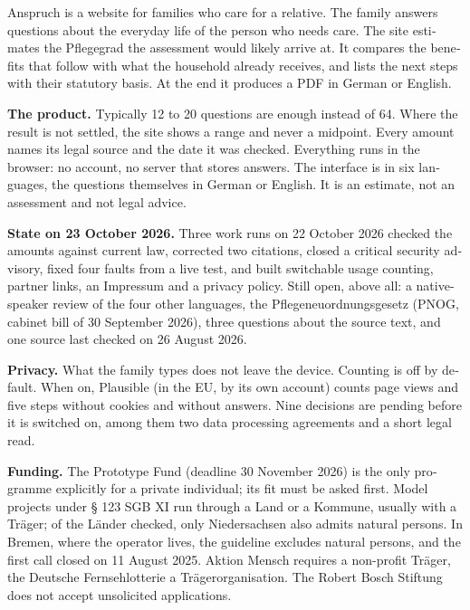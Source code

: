 \documentclass[10pt,parskip=half-]{scrartcl}
\begin{document}
\clearpage
\begin{otherlanguage}{english}

Anspruch is a website for families who care for a relative. The family answers questions about
the everyday life of the person who needs care. The site estimates the Pflegegrad the
assessment would likely arrive at. It compares the benefits that follow with what the household
already receives, and lists the next steps with their statutory basis. At the end it produces a
PDF in German or English.

\textbf{The product.} Typically 12 to 20 questions are enough instead of 64. Where the result is
not settled, the site shows a range and never a midpoint. Every amount names its legal source
and the date it was checked. Everything runs in the browser: no account, no server that stores
answers. The interface is in six languages, the questions themselves in German or English. It
is an estimate, not an assessment and not legal advice.

\textbf{State on 23 October 2026.} Three work runs on 22 October 2026 checked the amounts
against current law, corrected two citations, closed a critical security advisory, fixed four
faults from a live test, and built switchable usage counting, partner links, an Impressum and a
privacy policy. Still open, above all: a native-speaker review of the four other languages, the
Pflegeneuordnungsgesetz (PNOG, cabinet bill of 30 September 2026), three questions about the
source text, and one source last checked on 26 August 2026.

\textbf{Privacy.} What the family types does not leave the device. Counting is off by default.
When on, Plausible (in the EU, by its own account) counts page views and five steps without
cookies and without answers. Nine decisions are pending before it is switched on, among them
two data processing agreements and a short legal read.

\textbf{Funding.} The Prototype Fund (deadline 30 November 2026) is the only programme
explicitly for a private individual; its fit must be asked first. Model projects under § 123
SGB XI run through a Land or a Kommune, usually with a Träger; of the Länder checked, only
Niedersachsen also admits natural persons. In Bremen, where the operator lives, the guideline
excludes natural persons, and the first call closed on 11 August 2025. Aktion Mensch requires a non-profit Träger, the Deutsche Fernsehlotterie a
Trägerorganisation. The Robert Bosch Stiftung does not accept unsolicited applications.


\end{otherlanguage}
\end{document}
